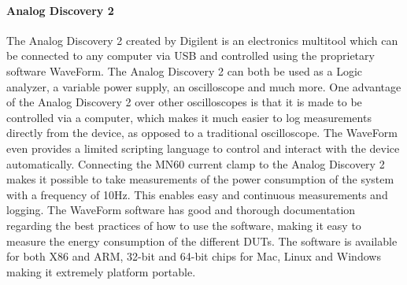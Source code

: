 \paragraph*{Analog Discovery 2}\label{par:AnalDisc2}
The Analog Discovery 2 created by Digilent\cite{AnalogDiscovery2} is an electronics multitool which can be connected to any computer via USB and controlled using the proprietary software WaveForm. The Analog Discovery 2 can both be used as a Logic analyzer, a variable power supply, an oscilloscope and much more\cite{AnalogDoc}. One advantage of the Analog Discovery 2 over other oscilloscopes is that it is made to be controlled via a computer, which makes it much easier to log measurements directly from the device, as opposed to a traditional oscilloscope. The WaveForm even provides a limited scripting language to control and interact with the device automatically. Connecting the MN60 current clamp to the Analog Discovery 2 makes it possible to take measurements of the power consumption of the system with a frequency of 10Hz. This enables easy and continuous measurements and logging. The WaveForm software has good and thorough documentation regarding the best practices of how to use the software, making it easy to measure the energy consumption of the different DUTs. The software is available for both X86 and ARM, 32-bit and 64-bit chips for Mac, Linux and Windows making it extremely platform portable.\cite{AnalogDoc}